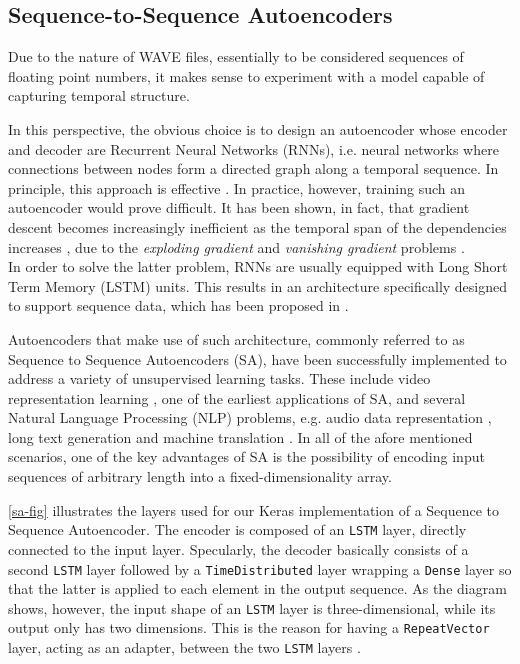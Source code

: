 \documentclass[11pt]{article}
\begin{document}
\subsection{Sequence-to-Sequence Autoencoders}  \label{seq2seq}
Due to the nature of WAVE files, essentially to be considered sequences of floating point numbers, it makes sense to experiment with a model capable of capturing temporal structure. \par
In this perspective, the obvious choice is to design an autoencoder whose encoder and decoder are Recurrent Neural Networks (RNNs), i.e. neural networks where connections between nodes form a directed graph along a temporal sequence. In principle, this approach is effective \cite{Sutskever.2014}. In practice, however, training such an autoencoder would prove difficult. It has been shown, in fact, that gradient descent becomes increasingly inefficient as the temporal span of the dependencies increases \cite{Bengio.1994}, due to the \textit{exploding gradient} and \textit{vanishing gradient} problems \cite{Pascanu.2012}.\\
In order to solve the latter problem, RNNs are usually equipped with Long Short Term Memory (LSTM) units. This results in an architecture specifically designed to support sequence data, which has been proposed in \cite{Hochreiter.1997}.\par
Autoencoders that make use of such architecture, commonly referred to as Sequence to Sequence Autoencoders (SA), have been successfully implemented to address a variety of unsupervised learning tasks.
These include video representation learning \cite{Srivastava.2015}, one of the earliest applications of SA, and several Natural Language Processing (NLP) problems, e.g. audio data representation \cite{Yu.2016}, long text generation \cite{Jiwei.2015} and machine translation \cite{Sutskever.2014}. In all of the afore mentioned scenarios, one of the key advantages of SA is the possibility of encoding input sequences of arbitrary length into a fixed-dimensionality array.\par
\autoref{sa-fig} illustrates the layers used for our Keras implementation of a Sequence to Sequence Autoencoder. The encoder is composed of an \texttt{LSTM} layer, directly connected to the input layer. Specularly, the decoder basically consists of a second \texttt{LSTM} layer followed by a \texttt{TimeDistributed} layer wrapping a \texttt{Dense} layer so that the latter is applied to each element in the output sequence. As the diagram shows, however, the input shape of an \texttt{LSTM} layer is three-dimensional, while its output only has two dimensions. This is the reason for having a \texttt{RepeatVector} layer, acting as an adapter, between the two \texttt{LSTM} layers \cite{Chollet.2015}.
\end{document}
